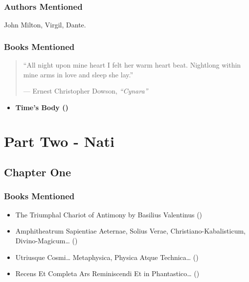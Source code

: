 \documentclass[
]{article}
\providecommand{\tightlist}{%
  \setlength{\itemsep}{0pt}\setlength{\parskip}{0pt}}
\begin{document}
\subsubsection{Authors Mentioned}\label{authors-mentioned-6}

John Milton, Virgil, Dante.

\subsubsection{Books Mentioned}\label{books-mentioned-7}

\begin{quote}
``All night upon mine heart I felt her warm heart beat. Nightlong within
mine arms in love and sleep she lay.''

--- Ernest Christopher Dowson, \emph{``Cynara''}
\end{quote}

\begin{itemize}
\tightlist
\item
  \textbf{Time's Body ()}
\end{itemize}

\newpage

\section{Part Two - Nati}\label{part-two---nati}

\subsection{Chapter One}\label{chapter-one-1}

\subsubsection{Books Mentioned}\label{books-mentioned-8}

\begin{itemize}
\tightlist
\item
  The Triumphal Chariot of Antimony by Basilius Valentinus
  ()
\item
  Amphitheatrum Sapientiae Aeternae, Solius Verae,
  Christiano-Kabalisticum, Divino-Magicum\ldots{}
  ()
\item
  Utriusque Cosmi\ldots{} Metaphysica, Physica Atque Technica\ldots{}
  ()
\item
  Recens Et Completa Ars Reminiscendi Et in Phantastico\ldots{}
  ()
\end{itemize}
\end{document}
